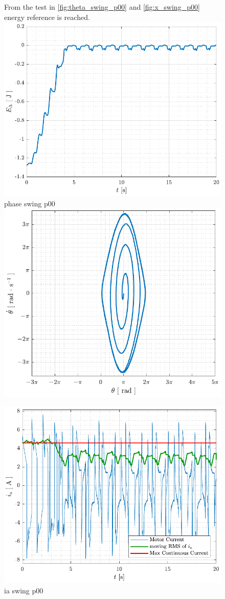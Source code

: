 \begin{figure}[H]
  \hspace{1cm}
  \captionbox
  {
    From the test in \autoref{fig:theta_swing_p00} and \ref{fig:x_swing_p00} energy reference is reached.
    \label{fig:Edelta_swing_p00}
  }
  {
    \hspace{-1cm}
    \includegraphics[width=.4\textwidth]{figures/Edelta_swing_p00}
  }
  \hspace{20pt}
  \captionbox 
  {
    phase swing p00
    \label{fig:phase_swing_p00}
  }
  {
    \hspace{-1cm}
    \includegraphics[width=.364\textwidth]{figures/phase_swing_p00}
  }  
\end{figure}

\begin{figure}[H]
  \includegraphics[width=.42\textwidth]{figures/ia_swing_p00}
  \caption{ ia swing p00 }
  \label{fig:ia_swing_p00}
\end{figure}

